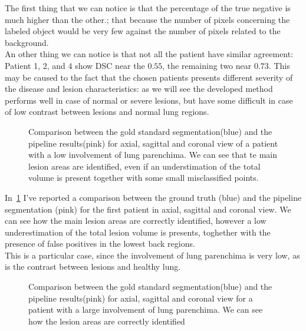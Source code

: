 \documentclass{standalone}
\begin{document}
	The first thing that we can notice is that the percentage of the true negative is much higher than the other.; that because the number of pixels concerning the labeled object would be very few against the number of pixels related to the background.\\ An other thing we can notice is that not all the patient have similar agreement: Patient 1, 2, and 4 show DSC near the $0.55$, the remaining two near $0.73$. This may be caused to the fact that the chosen patients presents different severity of the disease and lesion characteristics: as we will see the developed method performs well in case of normal or severe lesions, but have some difficult in case of low contrast between lesions and normal lung regions.
	 	
 		\begin{figure}[h!]
 		\centering
 			\caption{Comparison between the gold standard segmentation(blue) and the pipeline results(pink) for axial, sagittal and coronal view of a patient with a low involvement of lung parenchima. We can see that te main lesion areas are identified, even if an understimation of the total volume is present together with some small misclassified points.}\label{fig:pat1}
 		\end{figure}
 	
 	In \figurename\,\ref{fig:pat1} I've reported a comparison between the ground truth (blue) and the pipeline segmentation (pink) for the first patient in axial, sagittal and coronal view. We can see how the main lesion areas are correctly identified, however a low underestimation of the total lesion volume is presents, toghether with the presence of false positives in the lowest back regions.\\ This is a particular case, since the involvement of lung parenchima is very low, as is the contrast between lesions and healthy lung.\\
 	
 	
 		\begin{figure}[h!]
 			\centering
 		\caption{Comparison between the gold standard segmentation(blue) and the pipeline results(pink) for axial, sagittal and coronal view for a patient with a large involvement of lung parenchima. We can see how the lesion areas are correctly identified}\label{fig:pat3}
 		\end{figure}
 	
\end{document}
